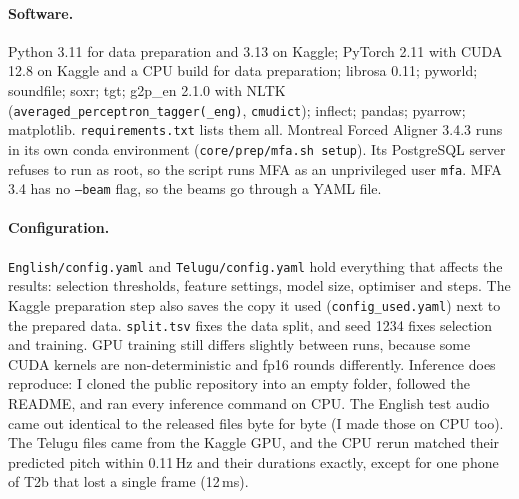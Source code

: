 \documentclass[11pt,a4paper]{article}
\newcommand{\code}[1]{\texttt{#1}}
\begin{document}
\paragraph{Software.} Python 3.11 for data preparation and 3.13 on Kaggle; PyTorch 2.11 with CUDA 12.8 on Kaggle
and a CPU build for data preparation; librosa 0.11; pyworld; soundfile; soxr; tgt; g2p\_en 2.1.0 with NLTK
(\code{averaged\_perceptron\_tagger(\_eng)}, \code{cmudict}); inflect; pandas; pyarrow; matplotlib.
\code{requirements.txt} lists them all. Montreal Forced Aligner 3.4.3 runs in its own conda environment
(\code{core/prep/mfa.sh setup}). Its PostgreSQL server refuses to run as root, so the script runs MFA as an
unprivileged user \code{mfa}. MFA 3.4 has no \code{--beam} flag, so the beams go through a YAML file.

\paragraph{Configuration.} \code{English/config.yaml} and \code{Telugu/config.yaml} hold everything that affects
the results: selection thresholds, feature settings, model size, optimiser and steps. The Kaggle preparation step also saves the
copy it used (\code{config\_used.yaml}) next to the prepared data. \code{split.tsv} fixes the data split, and seed 1234 fixes
selection and training. GPU training still differs slightly between runs, because some CUDA kernels are
non-deterministic and fp16 rounds differently. Inference does reproduce: I cloned the public repository into
an empty folder, followed the README, and ran every inference command on CPU. The English test audio came out
identical to the released files byte for byte (I made those on CPU too). The Telugu files came from the Kaggle GPU,
and the CPU rerun matched their predicted pitch within 0.11\,Hz and their durations exactly, except for one phone of
T2b that lost a single frame (12\,ms).
\end{document}
